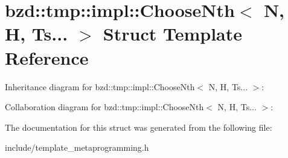 \hypertarget{structbzd_1_1tmp_1_1impl_1_1ChooseNth_3_01N_00_01H_00_01Ts_8_8_8_01_4}{}\section{bzd\+:\+:tmp\+:\+:impl\+:\+:Choose\+Nth$<$ N, H, Ts... $>$ Struct Template Reference}
\label{structbzd_1_1tmp_1_1impl_1_1ChooseNth_3_01N_00_01H_00_01Ts_8_8_8_01_4}


Inheritance diagram for bzd\+:\+:tmp\+:\+:impl\+:\+:Choose\+Nth$<$ N, H, Ts... $>$\+:


Collaboration diagram for bzd\+:\+:tmp\+:\+:impl\+:\+:Choose\+Nth$<$ N, H, Ts... $>$\+:


The documentation for this struct was generated from the following file\+:\begin{DoxyCompactItemize}
\item 
include/template\+\_\+metaprogramming.\+h\end{DoxyCompactItemize}
